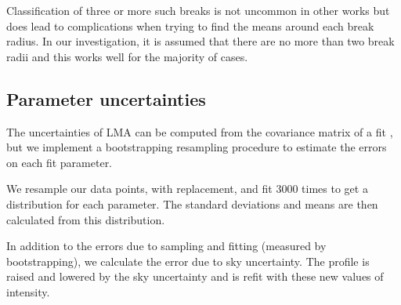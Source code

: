 Classification of three or more such breaks is not uncommon in other works \citep{pohlen_structure_2006,gutierrez_outer_2011} but does lead to complications when trying to find the means around each break radius. In our investigation, it is assumed that there are no more than two break radii and this works well for the majority of cases. 

\subsection{Parameter uncertainties}
The uncertainties of LMA can be computed from the covariance matrix of a fit \citep{hughes_measurements_2010}, but we implement a bootstrapping resampling procedure to estimate the errors on each fit parameter. 

We resample our data points, with replacement, and fit 3000 times to get a distribution for each parameter. The standard deviations and means are then calculated from this distribution.

In addition to the errors due to sampling and fitting (measured by bootstrapping), we calculate the error due to sky uncertainty. The profile is raised and lowered by the sky uncertainty and is refit with these new values of intensity. 